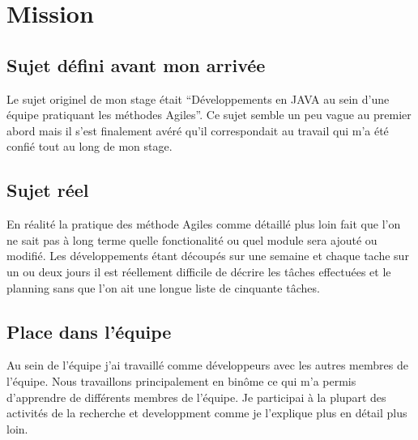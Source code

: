 \chapter{Mission}

\section{Sujet défini avant mon arrivée}
Le sujet originel de mon stage était ``Développements en JAVA au sein d'une équipe pratiquant les méthodes Agiles''. Ce sujet semble un peu vague au premier abord mais il s'est finalement avéré qu'il correspondait au travail qui m'a été confié tout au long de mon stage.
\section{Sujet réel}
En réalité la pratique des méthode Agiles comme détaillé plus loin fait que l'on ne sait pas à long terme quelle fonctionalité ou quel module sera ajouté ou modifié. Les développements étant découpés sur une semaine et chaque tache sur un ou deux jours il est réellement difficile de décrire les tâches effectuées et le planning sans que l'on ait une longue  liste de cinquante tâches.
\section{Place dans l'équipe}
Au sein de l'équipe j'ai travaillé comme développeurs avec les autres membres de l'équipe. Nous travaillons principalement en binôme ce qui m'a permis d'apprendre de différents membres de l'équipe. Je participai à la plupart des activités de la recherche et developpment comme je l'explique plus en détail plus loin.